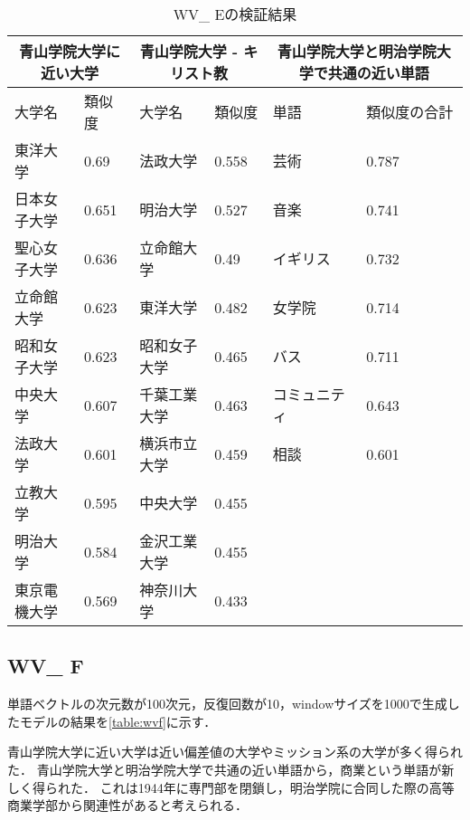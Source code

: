 \begin{table}[H]
\caption{WV\_ Eの検証結果}
\centering
\footnotesize
\begin{tabular}{ll|ll|ll}
\hline
\multicolumn{2}{c}{青山学院大学に近い大学} & \multicolumn{2}{c}{青山学院大学 - キリスト教} & \multicolumn{2}{c}{青山学院大学と明治学院大学で共通の近い単語}
\\ \hline
大学名 & 類似度 & 大学名 & 類似度 & 単語 & 類似度の合計
\\ \hline \hline
東洋大学 & 0.69 & 法政大学 & 0.558 & 芸術 & 0.787\\
日本女子大学 & 0.651 & 明治大学 & 0.527 & 音楽 & 0.741\\
聖心女子大学 & 0.636 & 立命館大学 & 0.49 & イギリス & 0.732\\
立命館大学 & 0.623 & 東洋大学 & 0.482 & 女学院 & 0.714\\
昭和女子大学 & 0.623 & 昭和女子大学 & 0.465 & バス & 0.711\\
中央大学 & 0.607 & 千葉工業大学 & 0.463 & コミュニティ & 0.643\\
法政大学 & 0.601 & 横浜市立大学 & 0.459 & 相談 & 0.601\\
立教大学 & 0.595 & 中央大学 & 0.455 & & \\
明治大学 & 0.584 & 金沢工業大学 & 0.455 & & \\
東京電機大学 & 0.569 & 神奈川大学 & 0.433 & & \\ \hline
\end{tabular}
\label{table:wve}
\end{table}

\subsection{WV\_ F}
単語ベクトルの次元数が100次元，反復回数が10，windowサイズを1000で生成したモデルの結果を\ref{table:wvf}に示す．

青山学院大学に近い大学は近い偏差値の大学やミッション系の大学が多く得られた．
青山学院大学と明治学院大学で共通の近い単語から，商業という単語が新しく得られた．
これは1944年に専門部を閉鎖し，明治学院に合同した際の高等商業学部から関連性があると考えられる．

